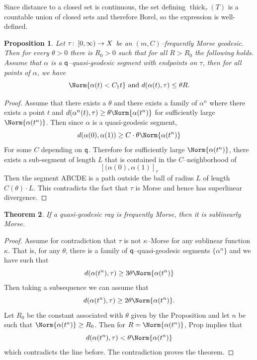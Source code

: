 \documentclass{amsart}
\newtheorem{thm}{Theorem}[section]
\newtheorem{prop}[thm]{Proposition}
\theoremstyle{definition}
\theoremstyle{remark}
\newcommand{\from}{\colon\thinspace}
\newcommand{\thick}{\ensuremath{\operatorname{thick}}\xspace}
\newcommand{\qq}{{\sf q}}
\begin{document}
Since distance to a closed set is continuous, the set defining $\thick_\tau(T)$ is a countable union of closed sets and therefore Borel, so the expression is well-defined. 
\begin{prop}
    Let $\tau \from [0, \infty) \to X$ be an  $(m, C)$--frequently Morse geodesic. Then for every $\theta > 0$ there is $R_0 > 0$ such that for all $R > R_0$ the following holds. Assume that $\alpha$ is a $\qq$--quasi-geodesic segment with endpoints on $\tau$, then for all points of $\alpha$, we have
    \[ \Norm{\alpha(t) < C_1 t} \text{ and } d(\alpha(t), \tau) \leq \theta R.\]
\end{prop}
\begin{proof}
Assume that there exists a $\theta$ and there exists a family of $\alpha^n$ where there exists a point $t$ and 
$ d(\alpha^n(t), \tau) \geq \theta \Norm{\alpha(t^n)}$ for sufficiently large $\Norm{\alpha(t^n)}$. Then since $\alpha$ is a quasi-geodesic segment, \[d(\alpha(0), \alpha(1)) \geq C \cdot \theta\Norm{\alpha(t^n)} \]
For some $C$ depending on $\qq$.
Therefore for sufficiently large $\Norm{\alpha(t^n)}$, there exists a sub-segment of length $L$ that is contained in the $C$--neighborhood of
\[
[(\alpha(0), \alpha(1)]_\tau 
\]
Then the segment ABCDE is a path outside the ball of radius $L$ of length $C(\theta) \cdot L$. This contradicts the fact that $\tau$ is Morse and hence has superlinear divergence. 
\end{proof}




\begin{thm}
If a quasi-geodesic ray is frequently Morse, then it is sublinearly Morse.
\end{thm}
\begin{proof}
Assume for contradiction that $\tau$ is not $\kappa$--Morse for any sublinear function $\kappa$. That is, for any $\theta$, there is a family of $\qq$--quasi-geodesic segments $\{ \alpha^n \}$ and we have
such that 
\[
d(\alpha(t^n), \tau)  \geq 3 \theta \Norm{\alpha(t^n)}
\]
Then taking a subsequence we can assume that 
\[
d(\alpha(t^n), \tau)  \geq 2 \theta \Norm{\alpha(t^n)}.
\]
Let $R_0$ be the constant associated with $\theta$ given by the Proposition and let $n$ be such that $\Norm{\alpha(t^n)} \geq R_0$. Then for $R = \Norm{\alpha(t^n)}$, Prop implies that 
\[
d(\alpha(t^n), \tau) < \theta \Norm{\alpha(t^n)}
\]
which contradicts the line before. The contradiction proves the theorem.
\end{proof}
\fi



 
\end{document}

